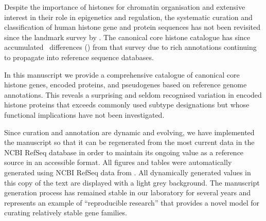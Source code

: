     Despite the importance of histones for chromatin organisation and extensive interest
    in their role in epigenetics and regulation, the systematic
    curation and classification of human histone
    gene and protein sequences has not been revisited
    since the landmark survey by \citet{Marzluff02}.
    The canonical core histone catalogue has since accumulated
    \TotalChangesSinceReference{}~differences ()
    from that survey due to rich annotations continuing to propagate
    into reference sequence databases.

    In this manuscript we provide a comprehensive catalogue
    of canonical core histone genes, encoded proteins, and pseudogenes
    based on reference genome annotations.
    This reveals a surprising and seldom recognised variation in encoded histone proteins
    that exceeds commonly used subtype designations
    but whose functional implications have not been investigated.

    Since curation and annotation are dynamic and evolving, we have
    implemented the manuscript so that it can be regenerated from the
    most current data in the NCBI RefSeq database in order to maintain
    its ongoing value as a reference source in an accessible format.  All
    figures and tables were automatically generated using NCBI RefSeq
    data from \printdate{\SequencesDate{}}.
    All dynamically generated values in this copy of the text are displayed
    with a light grey background.
    The manuscript generation process has remained stable in our laboratory for several years
    and represents an example of ``reproducible research'' \citep{Claerbout2000} that
    provides a novel model for curating relatively stable gene
    families.
